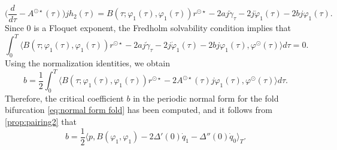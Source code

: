 \documentclass[english]{myarticle}
\begin{document}
\begin{sloppypar}
\begin{equation*}
    \bigg(\frac{d}{d \tau} - A^{\odot \star}(\tau) \bigg)jh_2(\tau) = B(\tau;\varphi_1(\tau),\varphi_1(\tau))r^{\odot \star} - 2aj\dot{\gamma}_\tau - 2j\dot{\varphi}_1(\tau) - 2bj\varphi_1(\tau).
\end{equation*}
Since $0$ is a Floquet exponent, the Fredholm solvability condition implies that
\begin{equation*}
    \int_0^T \langle B(\tau;\varphi_1(\tau),\varphi_1(\tau))r^{\odot \star} - 2a j\dot{\gamma}_\tau - 2j\dot{\varphi}_1(\tau) - 2b j\varphi_1(\tau), \varphi^{\odot}(\tau) \rangle d\tau = 0.
\end{equation*}
Using the normalization identities, we obtain
\begin{equation*}
    b = \frac{1}{2} \int_0^T \langle B(\tau;\varphi_1(\tau),\varphi_1(\tau))r^{\odot \star} - 2A^{\odot \star}(\tau)j\varphi_1(\tau), \varphi^{\odot}(\tau) \rangle d\tau.
\end{equation*}
Therefore, the critical coefficient $b$ in the periodic normal form for the fold bifurcation \eqref{eq:normal form fold} has been computed, and it follows from \cref{prop:pairing2} that
\begin{equation}  \label{eq:normalformcoeff fold}
    b = \frac{1}{2} \langle p, B(\varphi_1,\varphi_1) - 2 \Delta'(0)\dot{q}_1 - \Delta''(0)\dot{q}_0 \rangle_T.
\end{equation}


\end{sloppypar}
\end{document}
